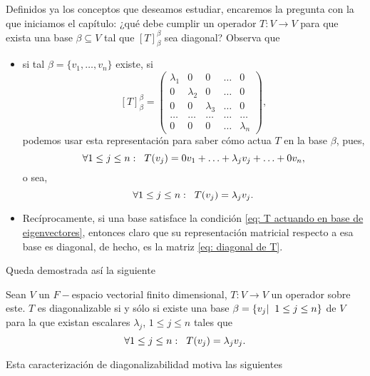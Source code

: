 Definidos ya los conceptos que deseamos estudiar, 
encaremos la pregunta
con la que iniciamos el capítulo: ¿qué debe cumplir un operador 
$T: V \longrightarrow V$ para que exista una base
$\beta \subseteq V$ tal que $[T]_{\beta}^{\beta}$ sea diagonal?
Observa que
\begin{itemize}
	\item si tal $\beta = \{ v_{1}, \ldots, v_{n} \}$ existe, si 
	\begin{equation}
		\label{eq: diagonal de T}
		[T]_{\beta}^{\beta} = \begin{pmatrix}
	\lambda_{1} & 0 & 0 & \ldots & 0 \\
	0 & \lambda_{2} & 0 & \ldots & 0 \\
	0 & 0 & \lambda_{3} & \ldots & 0 \\
	\ldots & \ldots & \ldots & \ldots & \ldots \\
	0 & 0 & 0 & \ldots & \lambda_{n} 
	\end{pmatrix},
	\end{equation}
	podemos usar esta representación para saber cómo actua $T$ en la
	base $\beta$, pues, 
	\[
	\forall 1 \leq j \leq n: \hspace{0.2cm}
	T(v_{j}) = 0 v_{1} + \ldots + \lambda_{j} v_{j} + \ldots + 0 v_{n},
	\]
	o sea, 
	\begin{equation}
	\label{eq: T actuando en base de eigenvectores}
	\forall 1 \leq j \leq n: \hspace{0.2cm}
	T(v_{j}) = \lambda_{j} v_{j}.
	\end{equation}
	\item Recíprocamente, si una base satisface la condición
	\eqref{eq: T actuando en base de eigenvectores}, entonces
	claro que su representación matricial respecto a esa base
	es diagonal, de hecho, es la matriz 
	\eqref{eq: diagonal de T}.
\end{itemize}
Queda demostrada así la siguiente
\begin{prop}
	\label{prop: condicion sii de operador diagonalizable}
	Sean $V$ un $F-$espacio vectorial finito dimensional,
	$T: V \longrightarrow V$ un operador sobre este. $T$
	es diagonalizable si y sólo si existe una base 
	$\beta = \{ v_{j}  | \hspace{0.2cm} 1 \leq j \leq n \}$ de $V$
	para la que existan escalares $\lambda_{j}$, $1 \leq j \leq n$
	tales que
	\[
	\forall 1 \leq j \leq n: \hspace{0.2cm}
	T(v_{j}) = \lambda_{j}v_{j}.
	\]
\end{prop}
Esta caracterización de diagonalizabilidad motiva las siguientes
